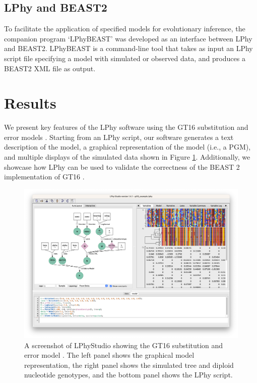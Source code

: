 \documentclass[10pt,letterpaper,table]{article}
\theoremstyle{definition}
\begin{document}
\subsection{LPhy and BEAST2}
\label{sec:lphybeast}
To facilitate the application of specified models for evolutionary inference, the companion program `LPhyBEAST' was developed as an interface between LPhy and BEAST2.
LPhyBEAST is a command-line tool that takes as input an LPhy script file specifying a model with simulated or observed data, and produces a BEAST2 XML file as output.

\section{Results}
We present key features of the LPhy software using the GT16 substitution and error models \cite{kozlov2022cellphy}. 
Starting from an LPhy script, our software generates a text description of the model, a graphical representation of the model (i.e., a PGM), and multiple displays of the simulated data shown in Figure \ref{fig:phylonco_lphystudio}. 
Additionally, we showcase how LPhy can be used to validate the correctness of the BEAST 2 implementation of GT16 \cite{chen2022accounting}.  

\begin{figure}[!ht]
    \centering
    \includegraphics[width=\textwidth]{figs_plos/Fig3.png }
    \caption{A screenshot of LPhyStudio showing the GT16 substitution and error model \cite{kozlov2022cellphy, chen2022accounting}. 
    The left panel shows the graphical model representation, the right panel shows the simulated tree and diploid nucleotide genotypes, and the bottom panel shows the LPhy script. }
    \label{fig:phylonco_lphystudio}
\end{figure}
\end{document}
